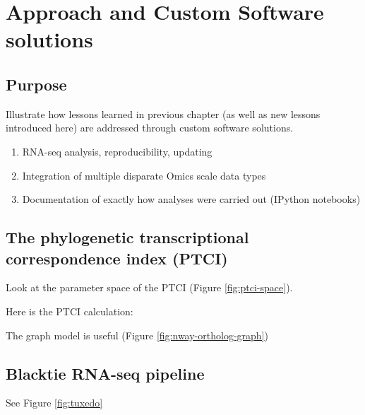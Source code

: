 
\chapter{Approach and Custom Software solutions}

\section{Purpose}
Illustrate how lessons learned in previous chapter (as well as new lessons introduced here) are addressed through custom software solutions.
\begin{enumerate}
 \item RNA-seq analysis, reproducibility, updating
 \item Integration of multiple disparate Omics scale data types
 \item Documentation of exactly how analyses were carried out (IPython notebooks)
\end{enumerate}


\section{The phylogenetic transcriptional correspondence index (PTCI)}








Look at the parameter space of the PTCI (Figure \ref{fig:ptci-space}).  


Here is the PTCI calculation:


The graph model is useful (Figure \ref{fig:nway-ortholog-graph})




\pagebreak[4]
\section{Blacktie RNA-seq pipeline}

See Figure \ref{fig:tuxedo}







